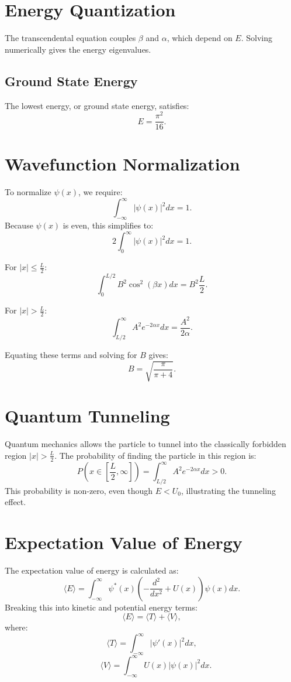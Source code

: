 \documentclass[a4paper,12pt]{article}
\begin{document}
\begin{multicols}{2}
\section{Energy Quantization}
The transcendental equation couples \( \beta \) and \( \alpha \), which depend on \( E \). Solving numerically gives the energy eigenvalues.

\subsection{Ground State Energy}
The lowest energy, or ground state energy, satisfies:
\[
E = \frac{\pi^2}{16}.
\]

\section{Wavefunction Normalization}
To normalize \( \psi(x) \), we require:
\[
\int_{-\infty}^\infty |\psi(x)|^2 dx = 1.
\]
Because \( \psi(x) \) is even, this simplifies to:
\[
2\int_0^\infty |\psi(x)|^2 dx = 1.
\]

For \( |x| \leq \frac{L}{2} \):
\[
\int_0^{L/2} B^2\cos^2(\beta x) dx = B^2 \frac{L}{2}.
\]

For \( |x| > \frac{L}{2} \):
\[
\int_{L/2}^\infty A^2 e^{-2\alpha x} dx = \frac{A^2}{2\alpha}.
\]

Equating these terms and solving for \( B \) gives:
\[
B = \sqrt{\frac{\pi}{\pi + 4}}.
\]

\section{Quantum Tunneling}
Quantum mechanics allows the particle to tunnel into the classically forbidden region \( |x| > \frac{L}{2} \). The probability of finding the particle in this region is:
\[
P(x \in [\frac{L}{2}, \infty]) = \int_{L/2}^\infty A^2 e^{-2\alpha x} dx > 0.
\]
This probability is non-zero, even though \( E < U_0 \), illustrating the tunneling effect.

\section{Expectation Value of Energy}
The expectation value of energy is calculated as:
\[
\langle E \rangle = \int_{-\infty}^\infty \psi^*(x) \left(-\frac{d^2}{dx^2} + U(x)\right) \psi(x) dx.
\]
Breaking this into kinetic and potential energy terms:
\[
\langle E \rangle = \langle T \rangle + \langle V \rangle,
\]
where:
\[
\langle T \rangle = \int_{-\infty}^\infty |\psi'(x)|^2 dx,
\]
\[
\quad
\langle V \rangle = \int_{-\infty}^\infty U(x)|\psi(x)|^2 dx.
\]


\end{multicols}
\end{document}
